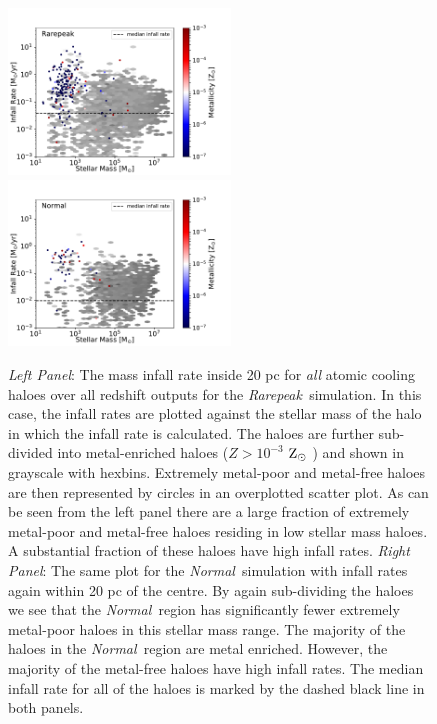 \documentclass[graphics, twocolumn, usenatbib]{mn2e}
\newcommand{\zsolar} {$\rm{Z_{\odot}}~$}
\newcommand{\rarepeak} {\textit{Rarepeak~}}
\newcommand{\normal} {\textit{Normal~}}
\begin{document}
\begin{figure}
\centering
\begin{minipage}{175mm}      \begin{center} 
\centerline{
\includegraphics[width=0.525\textwidth]{FIGURES/Rarepeak_MdotMstellarZ_Hexbin.pdf}
\includegraphics[width=0.525\textwidth]{FIGURES/Normal_MdotMstellarZ_Hexbin.pdf}}
\caption{\textit{Left Panel}: The mass infall rate inside 20 pc for \textit{all} atomic
  cooling haloes over all redshift outputs for the \rarepeak simulation. In this case,
  the infall rates are plotted against the stellar mass of the halo in which the infall rate is
  calculated. The haloes are further sub-divided into metal-enriched haloes ($Z > 10^{-3}$ \zsolar)
  and shown in grayscale with hexbins.
  Extremely metal-poor and metal-free  haloes are then represented by circles in
  an overplotted scatter plot. As can be seen from the left panel there are a large fraction of
  extremely metal-poor and metal-free haloes residing in low stellar mass haloes. A substantial
  fraction of these haloes have high infall rates. 
  \textit{Right Panel}: The same plot for the \normal simulation with
  infall rates again within 20 pc of the centre. By again sub-dividing the haloes
  we see that the \normal region has significantly fewer extremely metal-poor haloes in this stellar
  mass range. The majority of the
  haloes in the \normal region are metal enriched. However, the majority of the metal-free haloes
  have high infall rates. 
  The median infall rate for all of the haloes is marked by the dashed black line in both panels.}
\label{Fig:StellarMass}
\end{center} \end{minipage}

\end{figure}
\end{document}
